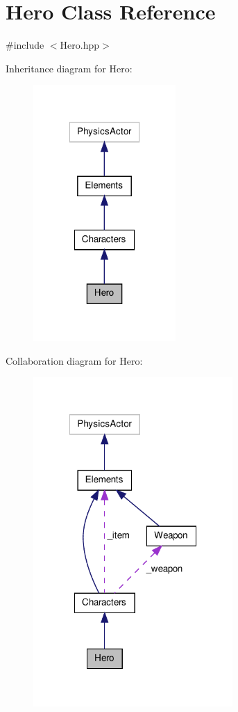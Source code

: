 \hypertarget{class_hero}{\section{Hero Class Reference}
\label{class_hero}
}


{\ttfamily \#include $<$Hero.\-hpp$>$}



Inheritance diagram for Hero\-:\nopagebreak
\begin{figure}[H]
\begin{center}
\leavevmode
\includegraphics[width=154pt]{class_hero__inherit__graph}
\end{center}
\end{figure}


Collaboration diagram for Hero\-:\nopagebreak
\begin{figure}[H]
\begin{center}
\leavevmode
\includegraphics[width=215pt]{class_hero__coll__graph}
\end{center}
\end{figure}

